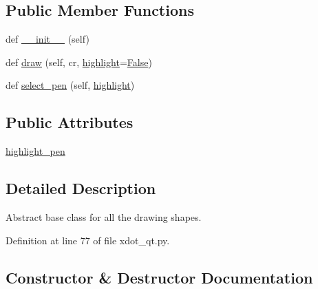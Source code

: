 \subsection*{Public Member Functions}
\begin{DoxyCompactItemize}
\item 
def \hyperlink{classsmacc__viewer_1_1xdot_1_1xdot__qt_1_1Shape_a92adffcc82c5640e3ec5f2228af262f0}{\+\_\+\+\_\+init\+\_\+\+\_\+} (self)
\item 
def \hyperlink{classsmacc__viewer_1_1xdot_1_1xdot__qt_1_1Shape_a35f7dea2ecd7e9bcc6ab5136eb3e637a}{draw} (self, cr, \hyperlink{namespacesmacc__viewer_1_1xdot_1_1xdot__qt_ab7970f10809cac5c23ebf9c6badb6d79}{highlight}=\hyperlink{namespacesmacc__viewer_a5928e8da279785cbab9011356c3eaa87}{False})
\item 
def \hyperlink{classsmacc__viewer_1_1xdot_1_1xdot__qt_1_1Shape_a7f20c9ecdb3c6117b8d1185c8155b122}{select\+\_\+pen} (self, \hyperlink{namespacesmacc__viewer_1_1xdot_1_1xdot__qt_ab7970f10809cac5c23ebf9c6badb6d79}{highlight})
\end{DoxyCompactItemize}
\subsection*{Public Attributes}
\begin{DoxyCompactItemize}
\item 
\hyperlink{classsmacc__viewer_1_1xdot_1_1xdot__qt_1_1Shape_a464b56cf481106c7a078eb195617c3c2}{highlight\+\_\+pen}
\end{DoxyCompactItemize}


\subsection{Detailed Description}
\begin{DoxyVerb}Abstract base class for all the drawing shapes.\end{DoxyVerb}
 

Definition at line 77 of file xdot\+\_\+qt.\+py.



\subsection{Constructor \& Destructor Documentation}
